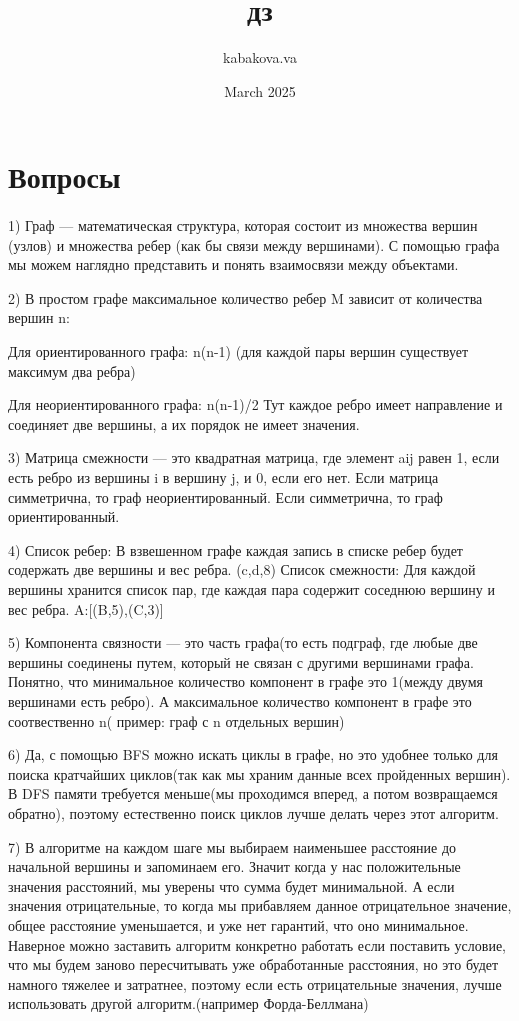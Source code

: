 \documentclass{article}
\title{дз}
\author{kabakova.va }
\date{March 2025}
\begin{document}
\maketitle

\section{Вопросы}
 \paragraph{}
{1) Граф —  математическая структура, которая состоит из множества вершин (узлов) и множества ребер (как бы связи между вершинами). С помощью графа мы можем наглядно представить и понять взаимосвязи между объектами.

2) В простом графе максимальное количество ребер M зависит от количества вершин n:

Для ориентированного графа: n(n-1) (для каждой пары вершин существует максимум два ребра)

Для неориентированного графа: n(n-1)/2
Тут каждое ребро имеет направление и соединяет две вершины, а их порядок не имеет значения. 

3) Матрица смежности — это квадратная матрица, где элемент aij равен 1, если есть ребро из вершины i в вершину j, и 0, если его нет.
Если матрица симметрична, то граф неориентированный. Если симметрична, то граф ориентированный.
 
4) Список ребер:
В взвешенном графе каждая запись в списке ребер будет содержать две вершины и вес ребра. (c,d,8)
Список смежности:
Для каждой вершины хранится список пар, где каждая пара содержит соседнюю вершину и вес ребра. A:[(B,5),(C,3)] 

5) Компонента связности — это часть графа(то есть подграф, где любые две вершины соединены путем,  который не связан с другими вершинами графа. Понятно, что минимальное количество компонент в графе это 1(между двумя вершинами есть ребро). А максимальное количество компонент в графе это соотвественно n( пример: граф с n отдельных вершин)

6) Да, с помощью BFS можно искать циклы в графе, но это удобнее только для поиска кратчайших циклов(так как мы храним данные всех пройденных вершин). В DFS памяти требуется меньше(мы проходимся вперед, а потом возвращаемся обратно), поэтому естественно поиск циклов лучше делать через этот алгоритм.

7) В алгоритме на каждом шаге мы выбираем наименьшее расстояние до начальной вершины и запоминаем его. Значит когда у нас положительные значения расстояний, мы уверены что сумма будет минимальной. А если значения отрицательные, то когда мы прибавляем данное отрицательное значение, общее расстояние уменьшается, и уже нет гарантий, что оно минимальное. Наверное можно заставить алгоритм конкретно работать если поставить условие, что мы будем заново пересчитывать уже обработанные расстояния, но это будет намного тяжелее и затратнее, поэтому если есть отрицательные значения, лучше использовать другой алгоритм.(например Форда-Беллмана)

}
\end{document}
